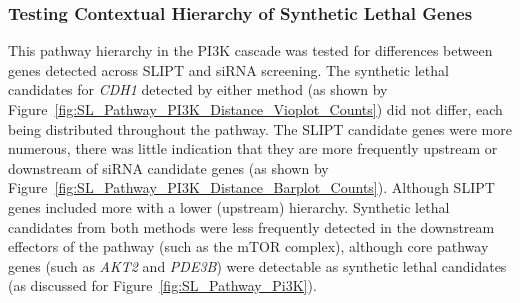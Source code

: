 \begin{figure*}[!htb]
\begin{mdframed}
  \begin{center}
  \resizebox{0.95 \textwidth}{!}{
    \fbox{
    \texttt{[image: \{"/home/tomkelly/Downloads/Pathway\_Structure/Discrete\_Pi3k/graph\_distance".pdf]}}
   }
   }
   \end{center}
   \caption[Structure of PI3K Ranking]{\small \textbf{Structure of PI3K Ranking.} Structure of PI3K Ranking.
}
\label{fig:SL_Pathway_PI3K_Ranking}
\end{mdframed}
\end{figure*}



\subsubsection{Testing Contextual Hierarchy of Synthetic Lethal Genes}  \label{chapt4:Network_Hierachy_Test}


This pathway hierarchy in the \gls{PI3K} cascade was tested for differences between genes detected across \gls{SLIPT} and \gls{siRNA} screening. The synthetic lethal candidates for \textit{CDH1} detected by either method (as shown by Figure~\ref{fig:SL_Pathway_PI3K_Distance_Vioplot_Counts}) did not differ, each being distributed throughout the pathway. The \gls{SLIPT} candidate genes were more numerous, there was little indication that they are more frequently upstream or downstream of \gls{siRNA} candidate genes (as shown by Figure~\ref{fig:SL_Pathway_PI3K_Distance_Barplot_Counts}). Although \gls{SLIPT} genes included more with a lower (upstream) hierarchy. Synthetic lethal candidates from both methods were less frequently detected in the downstream effectors of the pathway (such as the mTOR complex), although core pathway genes (such as \textit{AKT2} and \textit{PDE3B}) were detectable as synthetic lethal candidates (as discussed for Figure~\ref{fig:SL_Pathway_Pi3K}).

